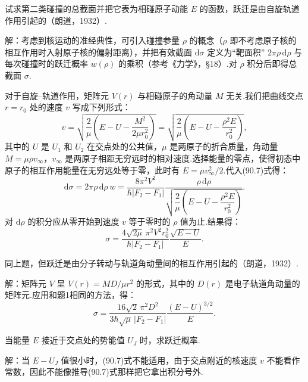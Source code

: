 \begin{xiti}

\quad 试求第二类碰撞的总截面并把它表为相碰原子动能 $E$ 的函数，跃迁是由自旋轨道作用引起的（朗道，1932）.

解：考虑到核运动的准经典性，可引入碰撞参量 $\rho$ 的概念（$\rho$ 即不考虑原子核的相互作用时入射原子核的偏射距离），并把有效截面 $\mathrm{d}\sigma$ 定义为“靶面积” $2\pi\rho\,\mathrm{d}\rho$ 与每次碰撞时的跃迁概率 $w(\rho)$ 的乘积（参考《力学》，§18）.对 $\rho$ 积分后即得总截面 $\sigma$.

对于自旋–轨道作用，矩阵元 $V(r)$ 与相碰原子的角动量 $M$ 无关.我们把曲线交点 $r=r_0$ 处的速度 $v$ 写成下列形式：
\begin{equation*}
  v=\sqrt{\frac{2}{\mu}\left(E-U-\frac{M^2}{2\mu r_0^2}\right)}
  =\sqrt{\frac{2}{\mu}\left(E-U-\frac{\rho^2E}{r_0^2}\right)},
\end{equation*}
其中的 $U$ 是 $U_1$ 和 $U_2$ 在交点处的公共值，$\mu$ 是两原子的折合质量，角动量 $M=\mu\rho v_\infty$，$v_\infty$ 是两原子相距无穷远时的相对速度.选择能量的零点，使得初态中原子的相互作用能量在无穷远处等于零，此时有 $E=\mu v_\infty^2/2$.代入(90.7)式得：
\begin{equation*}
  \mathrm{d}\sigma=2\pi\rho\,\mathrm{d}\rho\,w
  =\frac{8\pi^2V^2}{\hbar|F_2-F_1|}
  \frac{\rho\,\mathrm{d}\rho}{\sqrt{\dfrac{2}{\mu}\left(E-U-\dfrac{\rho^2E}{r_0^2}\right)}}.
\end{equation*}
对 $\mathrm{d}\rho$ 的积分应从零开始到速度 $v$ 等于零时的 $\rho$ 值为止.结果得：
\begin{equation*}
  \sigma=\frac{4\sqrt{2\mu}\,\pi^2V^2r_0^2}{\hbar|F_2-F_1|}
  \frac{\sqrt{E-U}}{E}.
\end{equation*}

\quad 同上题，但跃迁是由分子转动与轨道角动量间的相互作用引起的（朗道，1932）.

解：矩阵元 $V$ 呈 $V(r)=MD/\mu r^2$ 的形式，其中的 $D(r)$ 是电子轨道角动量的矩阵元.应用和题1相同的方法，得：
\begin{equation*}
  \sigma=\frac{16\sqrt{2}\,\pi^2D^2}{3\hbar\sqrt{\mu}\,|F_2-F_1|}
  \frac{(E-U)^{3/2}}{E}.
\end{equation*}

\quad 当能量 $E$ 接近于交点处的势能值 $U_J$ 时，求跃迁概率.

解：当 $E-U_J$ 值很小时，(90.7)式不能适用，由于交点附近的核速度 $v$ 不能看作常数，因此不能像推导(90.7)式那样把它拿出积分号外.


\end{xiti}
